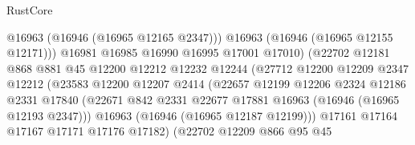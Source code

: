 \begin{lexlean}{RustCore}
\begin{coremodule}
                                        @16963
                                        (@16946 (@16965 @12165 @2347)))
                                      @16963
                                      (@16946 (@16965 @12155 @12171)))
                                    @16981
                                    @16985
                                    @16990
                                    @16995
                                    @17001
                                    @17010)
                                  (@22702
                                    @12181
                                    @868
                                    @881
                                    @45
                                    @12200
                                    @12212
                                    @12232
                                    @12244
                                    (@27712
                                      @12200
                                      @12209
                                      @2347
                                      @12212
                                      (@23583
                                        @12200
                                        @12207
                                        @2414
                                        (@22657
                                          @12199
                                          @12206
                                          @2324
                                          @12186
                                          @2331
                                          @17840
                                          (@22671
                                            @842
                                            @2331
                                            @22677
                                            @17881
                                            @16963
                                            (@16946 (@16965 @12193 @2347)))
                                          @16963
                                          (@16946 (@16965 @12187 @12199)))
                                        @17161
                                        @17164
                                        @17167
                                        @17171
                                        @17176
                                        @17182)
                                      (@22702
                                        @12209
                                        @866
                                        @95
                                        @45

\end{coremodule}
\end{lexlean}
